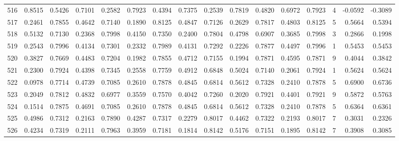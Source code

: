 \begin{tabular}{lrrrrrrrrrrrrrrr}
516 &      0.8515 &  0.5426 &  0.7101 &  0.2582 &  0.7923 &  0.4394 &  0.7375 &  0.2539 &  0.7819 &  0.4820 &   0.6972 &     0.7923 &      4 &                   -0.0592 &                    -0.3089 \\
517 &      0.2461 &  0.7855 &  0.4642 &  0.7140 &  0.1890 &  0.8125 &  0.4847 &  0.7126 &  0.2629 &  0.7817 &   0.4803 &     0.8125 &      5 &                    0.5664 &                     0.5394 \\
518 &      0.5132 &  0.7130 &  0.2368 &  0.7998 &  0.4150 &  0.7350 &  0.2400 &  0.7804 &  0.4798 &  0.6907 &   0.3685 &     0.7998 &      3 &                    0.2866 &                     0.1998 \\
519 &      0.2543 &  0.7996 &  0.4134 &  0.7301 &  0.2332 &  0.7989 &  0.4131 &  0.7292 &  0.2226 &  0.7877 &   0.4497 &     0.7996 &      1 &                    0.5453 &                     0.5453 \\
520 &      0.3827 &  0.7669 &  0.4483 &  0.7204 &  0.1982 &  0.7855 &  0.4712 &  0.7155 &  0.1994 &  0.7871 &   0.4595 &     0.7871 &      9 &                    0.4044 &                     0.3842 \\
521 &      0.2300 &  0.7924 &  0.4398 &  0.7345 &  0.2558 &  0.7759 &  0.4912 &  0.6848 &  0.5024 &  0.7140 &   0.2061 &     0.7924 &      1 &                    0.5624 &                     0.5624 \\
522 &      0.0978 &  0.7714 &  0.4739 &  0.7085 &  0.2610 &  0.7878 &  0.4845 &  0.6814 &  0.5612 &  0.7328 &   0.2410 &     0.7878 &      5 &                    0.6900 &                     0.6736 \\
523 &      0.2049 &  0.7812 &  0.4832 &  0.6977 &  0.3559 &  0.7570 &  0.4042 &  0.7260 &  0.2020 &  0.7921 &   0.4401 &     0.7921 &      9 &                    0.5872 &                     0.5763 \\
524 &      0.1514 &  0.7875 &  0.4691 &  0.7085 &  0.2610 &  0.7878 &  0.4845 &  0.6814 &  0.5612 &  0.7328 &   0.2410 &     0.7878 &      5 &                    0.6364 &                     0.6361 \\
525 &      0.4986 &  0.7312 &  0.2163 &  0.7890 &  0.4287 &  0.7317 &  0.2279 &  0.8017 &  0.4462 &  0.7322 &   0.2193 &     0.8017 &      7 &                    0.3031 &                     0.2326 \\
526 &      0.4234 &  0.7319 &  0.2111 &  0.7963 &  0.3959 &  0.7181 &  0.1814 &  0.8142 &  0.5176 &  0.7151 &   0.1895 &     0.8142 &      7 &                    0.3908 &                     0.3085 \\

\end{tabular}
